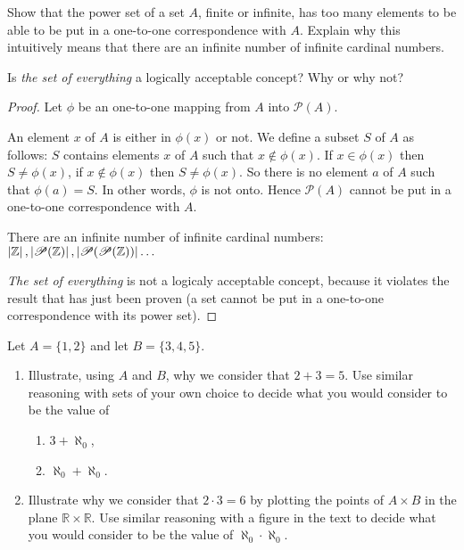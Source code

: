 \newpage
\begin{exercise}
    Show that the power set of a set $A$, finite or infinite, has too many elements to be able to be put in a one-to-one correspondence with $A$. Explain why this intuitively means that there are an infinite number of infinite cardinal numbers.

    Is \textit{the set of everything} a logically acceptable concept? Why or why not?
\end{exercise}

\begin{proof}
    Let $\phi$ be an one-to-one mapping from $A$ into $\mathscr{P}(A)$.

    An element $x$ of $A$ is either in $\phi(x)$ or not. We define a subset $S$ of $A$ as follows: $S$ contains elements $x$ of $A$ such that $x\notin\phi(x)$. If $x\in\phi(x)$ then $S\ne\phi(x)$, if $x\notin\phi(x)$ then $S\ne\phi(x)$. So there is no element $a$ of $A$ such that $\phi(a) = S$. In other words, $\phi$ is not onto. Hence $\mathscr{P}(A)$ cannot be put in a one-to-one correspondence with $A$.

    There are an infinite number of infinite cardinal numbers: $\left\vert{\mathbb{Z}}\right\vert, \left\vert{\mathscr{P}(\mathbb{Z})}\right\vert, \left\vert{\mathscr{P}(\mathscr{P}(\mathbb{Z}))}\right\vert\ldots$

    \textit{The set of everything} is not a logicaly acceptable concept, because it violates the result that has just been proven (a set cannot be put in a one-to-one correspondence with its power set).
\end{proof}

\newpage
\begin{exercise}
    Let $A = \{ 1, 2 \}$ and let $B = \{ 3, 4, 5 \}$.
    \begin{enumerate}[label={\textbf{\alph*.}}]
        \item Illustrate, using $A$ and $B$, why we consider that $2 + 3 = 5$. Use similar reasoning with sets of your own choice to decide what you would consider to be the value of
              \begin{enumerate}[label={\roman*.},topsep=0pt,itemsep=0pt]
                  \item $3 + \aleph_{0}$,
                  \item $\aleph_{0} + \aleph_{0}$.
              \end{enumerate}
        \item Illustrate why we consider that $2 \cdot 3 = 6$ by plotting the points of $A \times B$ in the plane $\mathbb{R}\times\mathbb{R}$. Use similar reasoning with a figure in the text to decide what you would consider to be the value of $\aleph_{0}\cdot\aleph_{0}$.
    \end{enumerate}
\end{exercise}

